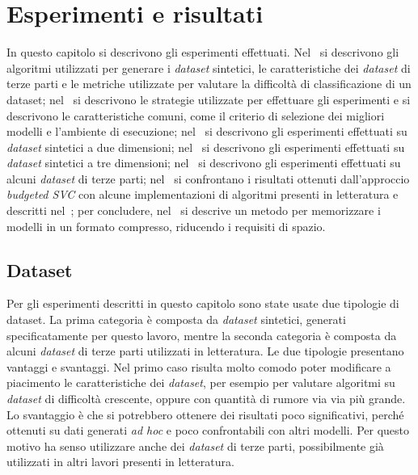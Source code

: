 \chapter{Esperimenti e risultati}
\label{chap:esperimenti}
In questo capitolo si descrivono gli esperimenti effettuati.
Nel~ si descrivono gli algoritmi utilizzati per generare i \emph{dataset} sintetici, le caratteristiche dei \emph{dataset} di terze parti e le metriche utilizzate per valutare la difficoltà di classificazione di un dataset;
nel~ si descrivono le strategie utilizzate per effettuare gli esperimenti e si descrivono le caratteristiche comuni, come il criterio di selezione dei migliori modelli e l'ambiente di esecuzione;
nel~ si descrivono gli esperimenti effettuati su \emph{dataset} sintetici a due dimensioni;
nel~ si descrivono gli esperimenti effettuati su \emph{dataset} sintetici a tre dimensioni;
nel~ si descrivono gli esperimenti effettuati su alcuni \emph{dataset} di terze parti;
nel~ si confrontano i risultati ottenuti dall'approccio \emph{budgeted SVC} con alcune implementazioni di algoritmi presenti in letteratura e descritti nel~; per concludere, nel~ si descrive un metodo per memorizzare i modelli in un formato compresso, riducendo i requisiti di spazio. 

\section{Dataset}\label{sec:exp:dataset}
Per gli esperimenti descritti in questo capitolo sono state usate due tipologie di dataset. 
La prima categoria è composta da \emph{dataset} sintetici, generati specificatamente per questo lavoro, mentre la seconda categoria è composta da alcuni \emph{dataset} di terze parti utilizzati in letteratura. 
Le due tipologie presentano vantaggi e svantaggi. Nel primo caso risulta molto comodo poter modificare a piacimento le caratteristiche dei \emph{dataset}, per esempio per valutare algoritmi su \emph{dataset} di difficoltà crescente, oppure con quantità di rumore via via più grande.
Lo svantaggio è che si potrebbero ottenere dei risultati poco significativi, perché ottenuti su dati generati \emph{ad hoc} e poco confrontabili con altri modelli. 
Per questo motivo ha senso utilizzare anche dei \emph{dataset} di terze parti, possibilmente già utilizzati in altri lavori presenti in letteratura.

